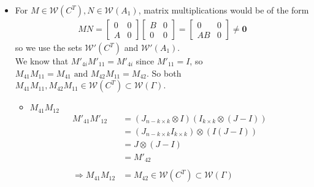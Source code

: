 \documentclass{article}
\begin{document}
\begin{itemize}
\begin{itemize}
        \item For $M\in\mathcal{W}(C^T),N \in \mathcal{W}(A_1)$, matrix multiplications would be of the form \\
        \begin{align*}
            MN = \begin{bmatrix}
                0 & 0 \\ A & 0
            \end{bmatrix}\begin{bmatrix}
                B&0\\0&0
            \end{bmatrix} = \begin{bmatrix}
                0&0\\AB&0
            \end{bmatrix}\neq \mathbf{0}
        \end{align*}
        so we use the sets $\mathcal{W'}(C^T)$ and $\mathcal{W'}(A_1)$. \\
        
        We know that $M'_{4i}M'_{11} = M'_{4i}$ since $M'_{11} = I$, so $M_{41}M_{11} = M_{41} \text{ and } M_{42}M_{11} = M_{42}$. So both $M_{41}M_{11}, M_{42}M_{11} \in \mathcal{W}(C^T) \subset\mathcal{W}(\Gamma)$.

        \begin{itemize}
            \item $M_{41}M_{12}$ \\
            \begin{align*}
                M'_{41}M'_{12}
                &= (J_{n-k\times k}\otimes I)(I_{k\times k}\otimes(J-I)) \\
                &= (J_{n-k\times k}I_{k\times k})\otimes(I(J-I)) \\
                &= J\otimes (J-I) \\
                &= M'_{42} \\ \\
                \Rightarrow M_{41}M_{12} &= M_{42} \in \mathcal{W}(C^T) \subset \mathcal{W}(\Gamma)
            \end{align*}


\end{itemize}
\end{itemize}
\end{itemize}
\end{document}
